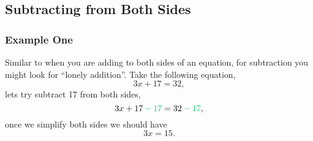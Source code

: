 \documentclass[a4paper,12pt]{article}
\begin{document}
\subsection*{Subtracting from Both Sides}

\subsubsection*{Example One}

Similar to when you are adding to both sides of an equation, for
subtraction you might look for ``lonely addition''. Take 
the following equation,
$$3x + 17 = 32,$$
lets try subtract {\color{SpringGreen3}17} from both sides,
$$3x + 17 \color{SpringGreen3} - 17\color{black} = 32 \color{SpringGreen3} - 17\color{black},$$
once we simplify both sides we should have
$$3x = 15.$$
\end{document}
